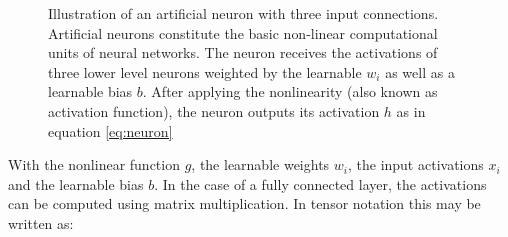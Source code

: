 \begin{figure}
    \centering
{}
\caption[Illustration of an artificial neuron with three input connections]{Illustration of an artificial neuron with three input connections. Artificial neurons constitute the basic non-linear computational units of neural networks. The neuron receives the activations of three lower level neurons weighted by the learnable $w_i$ as well as a learnable bias $b$. After applying the nonlinearity (also known as activation function), the neuron outputs its activation $h$ as in equation  \ref{eq:neuron}}\label{fig:neuron}
\end{figure}\noindent
With the nonlinear function $g$, the learnable weights $w_i$, the input activations $x_i$ and the learnable bias $b$. In the case of a fully connected layer, the activations can be computed using matrix multiplication. In tensor notation this may be written as:
